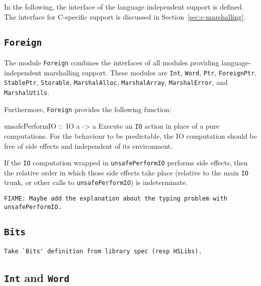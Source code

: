 \documentclass[a4paper,twosides]{article}
\makeatletter
\newcommand{\code}[1]{\texttt{#1}}      %
\newenvironment{codedesc}{%
  \list{}{\labelwidth\z@
    \let\makelabel\codedesclabel}
  }{%
  \endlist
  }
\newcommand*{\codedesclabel}[1]{%
  \hspace{-\leftmargin}
  \parbox[b]{\labelwidth}{\makebox[0pt][l]{\code{#1}}\\}\hfil\relax
  }
\makeatother
\begin{document}
In the following, the interface of the language independent support is
defined.  The interface for C-specific support is discussed in
Section~\ref{sec:c-marshalling}. 

\subsection{\code{Foreign}}
\label{sec:Foreign}

The module \code{Foreign} combines the interfaces of all modules providing
language-independent marshalling support.  These modules are \code{Int},
\code{Word}, \code{Ptr}, \code{ForeignPtr}, \code{StablePtr}, \code{Storable},
\code{MarshalAlloc}, \code{MarshalArray}, \code{MarshalError}, and
\code{MarshalUtils}.

Furthermore, \code{Foreign} provides the following function:
%
\begin{codedesc}
\item[unsafePerformIO ::\ IO a -> a] Execute an \code{IO} action in place of a
  pure computations.  For the behaviour to be predictable, the IO computation
  should be free of side effects and independent of its environment.
  
  If the \code{IO} computation wrapped in \code{unsafePerformIO} performs side
  effects, then the relative order in which those side effects take place
  (relative to the main \code{IO} trunk, or other calls to
  \code{unsafePerformIO}) is indeterminate.
\end{codedesc}

\begin{verbatim}
FIXME: Maybe add the explanation about the typing problem with unsafePerformIO.
\end{verbatim}

\subsection{\code{Bits}}

\begin{verbatim}
Take `Bits' definition from library spec (resp HSLibs).
\end{verbatim}

\subsection{\code{Int} and \code{Word}}
\label{sec:Int-Word}
\end{document}
